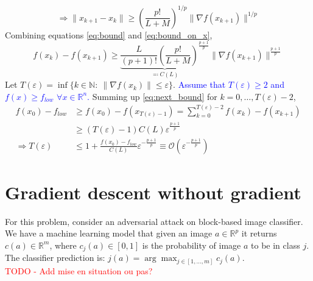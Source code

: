 \documentclass[12pt, openany]{report}
\newcommand{\R}{\mathbb{R}}
\renewcommand{\O}{\mathcal{O}}
\theoremstyle{definition}
\begin{document}
\begin{equation}\label{eq:bound_on_x}
	\Longrightarrow \lVert x_{k+1}-x_k\rVert \ge \left(\frac{p!}{L+M}\right)^{1/p}\lVert \nabla f(x_{k+1})\rVert^{1/p}
\end{equation}
Combining equations \eqref{eq:bound} and \eqref{eq:bound_on_x}, 
\begin{equation}\label{eq:next_bound}
	f(x_k)-f(x_{k+1}) \ge \underbrace{\frac{L}{(p+1)!}\left(\frac{p!}{L+M}\right)^{\frac{p+1}{p}}}_{\eqqcolon C(L)} \lVert \nabla f(x_{k+1})\rVert^{\frac{p+1}{p}}
\end{equation}
Let $T(\varepsilon) = \inf \{k\in \mathbb{N}:\: \lVert \nabla f(x_k)\rVert\le \varepsilon\}$. \textcolor{blue}{Assume that $T(\varepsilon)\ge 2$ and $f(x)\ge f_{low}$ $\forall x\in \R^n$.} Summing up \eqref{eq:next_bound} for $k=0,\dots, T(\varepsilon)-2$,
\begin{equation}
	\begin{aligned}
		f(x_0)-f_{low} &\ge f(x_0)-f(x_{T(\varepsilon)-1}) = \sum_{k=0}^{T(\varepsilon)-2} f(x_k)-f(x_{k+1}) \\ 
		& \ge (T(\varepsilon)-1)C(L) \varepsilon^{\frac{p+1}{p}}\\
		\Longrightarrow T(\varepsilon) &\le 1 + \frac{f(x_0)-f_{low}}{C(L)} \varepsilon^{-\frac{p+1}{p}} \equiv \O\left(\varepsilon^{-\frac{p+1}{p}}\right)
	\end{aligned}
\end{equation}
\chapter{Gradient descent without gradient}\label{chap:}
For this problem, consider an adversarial attack on block-based image classifier. We have a machine learning model that given an image $a\in\R^p$ it returns $c(a)\in\R^m$, where $c_j(a) \in [0,1]$ is the probability of image $a$ to be in class $j$. The classifier prediction is: $j(a) = \arg\max_{j\in [1,\dots,m]} c_j(a)$.\\
\textcolor{red}{TODO - Add mise en situation ou pas?}
\newline
\end{document}
